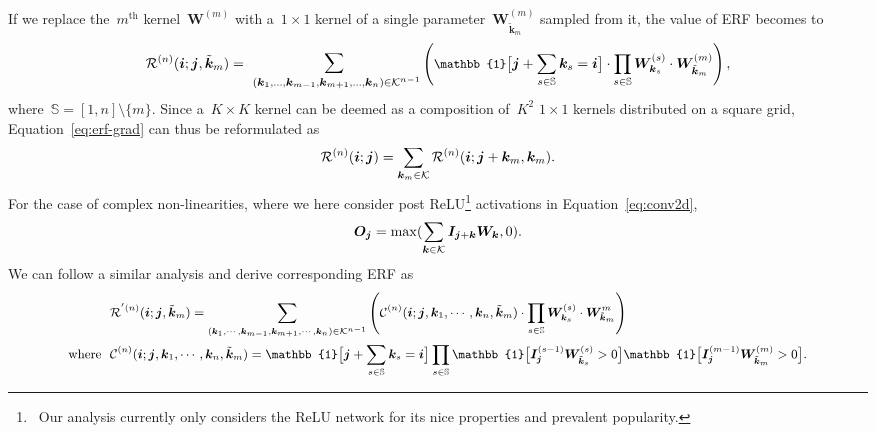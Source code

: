 \documentclass{article} \usepackage{iclr2020_conference, times}
\def\vi{{\bm{i}}}
\def\vj{{\bm{j}}}
\def\vk{{\bm{k}}}
\def\mI{{\bm{I}}}
\def\mO{{\bm{O}}}
\def\mW{{\bm{W}}}
\def\gC{{\mathcal{C}}}
\def\gK{{\mathcal{K}}}
\def\gR{{\mathcal{R}}}
\def\sS{{\mathbb{S}}}
\begin{document}
If we replace the~$m^{\text{th}}$ kernel~$\mW^{(m)}$ with a~$1 \times 1$
kernel of a single parameter~$\mW^{(m)}_{\tilde{\vk}_m}$ sampled from it, the
value of ERF becomes to
\begin{equation}
\small
    \label{eq:erf-grad-m}
    \gR^{(n)}(\vi; \vj, \tilde{\vk}_m)
    =
    \mathlarger{\mathlarger{\sum}}_{\
        (\vk_1, \ldots, \vk_{m-1}, \vk_{m+1}, \ldots, \vk_{n}) \in \gK^{n-1}
    }
    \left(
        \mathbb{1}\big[
            \vj + \sum_{s \in \sS} \vk_{s} = \vi
        \big]
        \cdot
        \prod_{s \in \sS} \mW^{(s)}_{\vk_s}
        \cdot
        \mW^{(m)}_{\tilde{\vk}_m}
    \right),
\end{equation}
where~$\sS = [1, n] \setminus \{m\}$. Since a~$K \times K$ kernel can be deemed
as a composition of~$K^2$ $1 \times 1$ kernels distributed on a square
grid, Equation~\ref{eq:erf-grad} can thus be reformulated as
\begin{equation}
\small
    \label{eq:erf-grad-reformulate}
    \gR^{(n)}(\vi; \vj)
    =
    \sum_{\vk_{m} \in \gK}
    \gR^{(n)}(\vi; \vj + \vk_m, \vk_m).
\end{equation}
For the case of complex non-linearities, where we here consider post ReLU\footnote{\
    Our analysis currently only considers the ReLU network for its
    nice properties and prevalent popularity.
} activations in
Equation~\ref{eq:conv2d},
\begin{equation}
\small
    \label{eq:conv2d-relu}
    \mO_{\vj} =
    \max(\sum_{\vk \in \gK} \mI_{\vj + \vk} \mW_{\vk}, 0).
\end{equation}
We can follow a similar analysis and derive corresponding ERF as
\begin{equation*}
\small
\label{eq:erf-grad-m-relu}
\begin{split}
    &
    \gR^{'(n)}(\vi; \vj, \tilde{\vk}_m)
    =
    \sum_{
        (\vk_1, \cdots, \vk_{m-1}, \vk_{m+1}, \cdots, \vk_n)
        \in
        \gK^{n - 1}
    }
    \left(
        \gC^{(n)}(\vi; \vj, \vk_1, \cdots, \vk_n, \tilde{\vk}_m)
        \cdot
        \prod_{s \in \sS} \mW_{\vk_s}^{(s)}
        \cdot
        \mW_{\tilde{\vk}_m}^{m}
    \right)
    \\
    \text{where ~}
    &
    \gC^{(n)}(\vi; \vj, \vk_1, \cdots, \vk_n, \tilde{\vk}_m)
    =
    \mathbb{1}\big[
        \vj + \sum_{s \in \sS} \vk_s = \vi
    \big]
    \prod_{s \in \sS}
    \mathbb{1}\big[
        \mI_{\vj}^{(s - 1)} \mW_{\tilde{\vk}_s}^{(s)} > 0
    \big]
    \mathbb{1}\big[
        \mI_{\vj}^{(m - 1)} \mW_{\tilde{\vk}_m}^{(m)} > 0
    \big].
\end{split}
\end{equation*}
\end{document}
